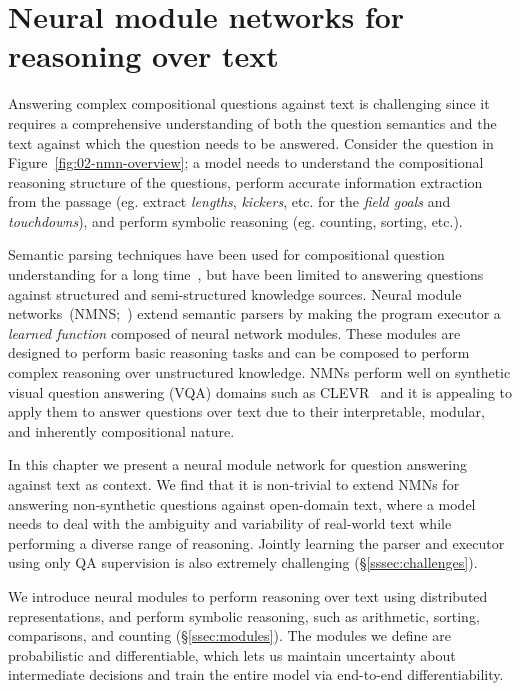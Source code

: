 \documentclass[main.tex]{subfiles}
\begin{document}
\section{Neural module networks for reasoning over text} %
\label{sec:nmn-drop}

Answering complex compositional questions against text is challenging since it requires a comprehensive understanding of both the question semantics and the text against which the question needs to be answered.
Consider the question in Figure~\ref{fig:02-nmn-overview}; a model needs to understand the compositional reasoning structure of the questions, perform accurate information extraction from the passage (eg. extract \textit{lengths}, \textit{kickers}, etc. for the \textit{field goals} and \textit{touchdowns}), and perform symbolic reasoning (eg. counting, sorting, etc.).

Semantic parsing techniques have been used for compositional question understanding for a long time~\cite{zelle-1996,zettlemoyer-pccg-2005,liang-dcs-2011}, but have been limited to answering questions against structured and semi-structured knowledge sources.
Neural module networks~(NMNS;~) extend semantic parsers by making the program executor a \emph{learned function} composed of neural network modules.
These modules are designed to perform basic reasoning tasks and can be composed to perform complex reasoning over unstructured knowledge.
NMNs perform well on synthetic visual question answering (VQA) domains such as CLEVR~\cite{clevr-2017} and it is appealing to apply them to answer questions over text due to their interpretable, modular, and inherently compositional nature.


In this chapter we present a neural module network for question answering against text as context.
We find that it is non-trivial to extend NMNs for answering non-synthetic questions against open-domain text, where a model needs to deal with the ambiguity and variability of real-world text while performing a diverse range of reasoning.  Jointly learning the parser and executor using only QA supervision is also extremely challenging (\S\ref{sssec:challenges}).

We introduce neural modules to perform reasoning over text using distributed representations, and perform symbolic reasoning, such as arithmetic, sorting, comparisons, and counting (\S\ref{ssec:modules}).
The modules we define are probabilistic and differentiable, which lets us maintain uncertainty about intermediate decisions and train the entire model via end-to-end differentiability.
\end{document}
